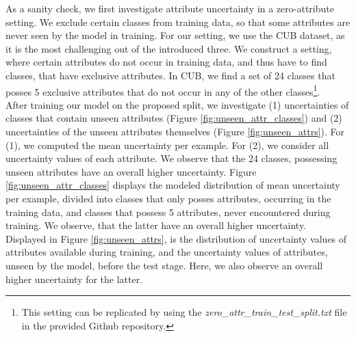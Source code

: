 \documentclass[a4paper,cleardoubleempty,BCOR1cm, 11pt]{report}
\begin{document}
As a sanity check, we first investigate attribute uncertainty in a zero-attribute setting. We exclude certain classes from training data, so that some attributes are never seen by the model in training. For our setting, we use the CUB dataset, as it is the most challenging out of the introduced three. We construct a setting, where certain attributes do not occur in training data, and thus have to find classes, that have exclusive attributes. In CUB, we find a set of 24 classes that posses 5 exclusive attributes that do not occur in any of the other classes\footnote{This setting can be replicated by using the \textit{zero\_attr\_train\_test\_split.txt} file in the provided Github repository.}.\\
After training our model on the proposed split, we investigate (1) uncertainties of classes that contain unseen attributes (Figure \ref{fig:unseen_attr_classes}) and (2) uncertainties of the unseen attributes themselves (Figure \ref{fig:unseen_attrs}). For (1), we computed the mean uncertainty per example. For (2), we consider all uncertainty values of each attribute.
We observe that the 24 classes, possessing unseen attributes have an overall higher uncertainty. Figure \ref{fig:unseen_attr_classes} displays the modeled distribution of mean uncertainty per example, divided into classes that only posses attributes, occurring in the training data, and classes that possess 5 attributes, never encountered during training. We observe, that the latter have an overall higher uncertainty.\\
Displayed in Figure \ref{fig:unseen_attrs}, is the distribution of uncertainty values of attributes available during training, and the uncertainty values of attributes, unseen by the model, before the test stage. Here, we also observe an overall higher uncertainty for the latter.
\end{document}
